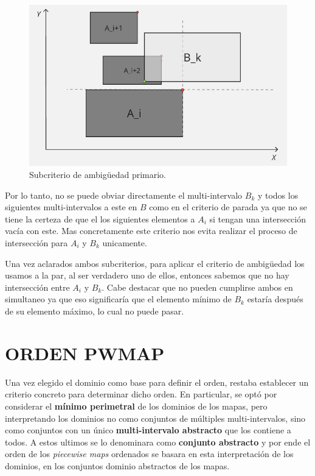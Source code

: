 \begin{itemize}
\begin{figure}[h]
    \vspace{0.5cm}

    \includegraphics[width=0.6\linewidth]{figures/Optimazaciones/Interseccion/criterio de amb sec 2.png}\par
    \caption{Subcriterio de ambigüedad primario.}
    \label{fig:enter-label}
    
    \end{figure}

    Por lo tanto, no se puede obviar directamente el multi-intervalo $B_k$ y todos los siguientes multi-intervalos a este en $B$ como en el criterio de parada ya que no se tiene la certeza de que el los siguientes elementos a $A_i$ si tengan una intersección vacía con este. Mas concretamente este criterio nos evita realizar el proceso de intersección para $A_i$ y  $B_k$ unicamente.
    
\end{itemize}

Una vez aclarados ambos subcriterios, para aplicar el criterio de ambigüedad los usamos a la par, al ser verdadero uno de ellos, entonces sabemos que no hay intersección entre  $A_i$ y  $B_k$. Cabe destacar que no pueden cumplirse ambos en simultaneo ya que eso significaría que el elemento mínimo de $B_k$ estaría después de su elemento máximo, lo cual no puede pasar.

\chapter{ORDEN PWMAP}

Una vez elegido el dominio como base para definir el orden, restaba establecer un criterio concreto para determinar dicho orden. En particular, se optó por considerar el \textbf{mínimo perimetral} de los dominios de los mapas, pero interpretando los dominios no como conjuntos de múltiples multi-intervalos, sino como conjuntos con un único \textbf{multi-intervalo abstracto} que los contiene a todos. A estos ultimos se lo denominara como \textbf{conjunto abstracto} y por ende el orden de los \textit{piecewise maps} ordenados se basara en esta interpretación de los dominios, en los conjuntos dominio abstractos de los mapas.

